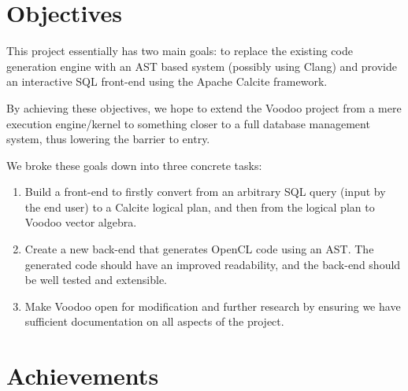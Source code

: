 \section{Objectives}

This project essentially has two main goals: to replace the existing code generation engine with an AST based system (possibly using Clang) and provide an interactive SQL front-end using the Apache Calcite framework.

By achieving these objectives, we hope to extend the Voodoo project from a mere execution engine/kernel to something closer to a full database management system, thus lowering the barrier to entry.

We broke these goals down into three concrete tasks:
\begin{enumerate}
    \item \label{obj1} Build a front-end to firstly convert from an arbitrary SQL query (input by the end user) to a Calcite logical plan, and then from the logical plan to Voodoo vector algebra.
    \item \label{obj2} Create a new back-end that generates OpenCL code using an AST. The generated code should have an improved readability, and the back-end should be well tested and extensible.
    \item \label{obj3} Make Voodoo open for modification and further research by ensuring we have sufficient documentation on all aspects of the project.
\end{enumerate}

\section{Achievements}

